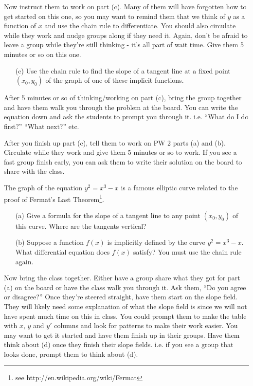 \documentclass[epsf]{article}
\begin{document}
 Now instruct them to work on part (c).  Many of them will have forgotten how to get started on this one, so you may want to remind them that we think of $y$ as a function of $x$ and use the chain rule to differentiate.  You should also circulate while they work and nudge groups along if they need it.  Again, don't be afraid to leave a group while they're still thinking - it's all part of wait time.  Give them 5 minutes or so on this one.

\vskip 2mm

\begin{itemize}

\item[(c)] Use the chain rule to find the slope of a tangent line at a fixed point $(x_0, y_0)$ of the graph of
one of these implicit functions.  \\
\end{itemize}

 After 5 minutes or so of thinking/working on part (c), bring the group together and have them walk you through the problem at the board.  You can write the equation down and ask the students to prompt you through it.  i.e. ``What do I do first?''  ``What next?'' etc.

\vskip 2mm
\newpage

 After you finish up part (c), tell them to work on PW 2 parts (a) and (b).  Circulate while they work and give them 5 minutes or so to work.  If you see a fast group finish early, you can ask them to write their solution on the board to share with the class.  

\vskip 2mm

 The graph of the equation $y^2=x^3-x$ is a famous elliptic curve related to the proof of Fermat's Last Theorem\footnote{see http://en.wikipedia.org/wiki/Fermat}. 

\begin{itemize}
\item[(a)] Give a formula for the slope of a tangent line to any point $(x_0, y_0)$ of this curve.  Where are the tangents vertical?

\item[(b)] Suppose a function $f(x)$ is implicitly defined by the curve $y^2=x^3-x$.  What differential equation
does $f(x)$ satisfy?  You must use the chain rule again.
\end{itemize}

Now bring the class together.  Either have a group share what they got for part (a) on the board or have the class walk you through it.  Ask them, ``Do you agree or disagree?''  Once they're steered straight, have them start on the slope field.  They will likely need some explanation of what the slope field is since we will not have spent much time on this in class.  You could prompt them to make the table with $x$, $y$ and $y'$ columns and look for patterns to make their work easier.   You may want to get it started and have them finish up in their groups.
\vskip 2mm
 Have them think about (d) once they finish their slope fields.  i.e. if you see a group that looks done, prompt them to think about (d).
\end{document}
